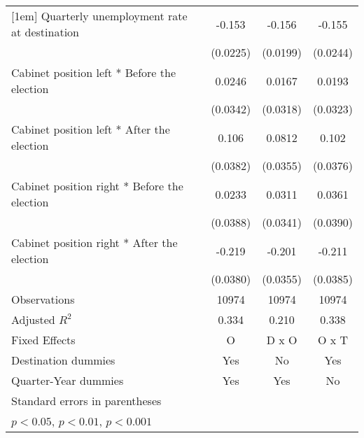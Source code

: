 \begin{table}[htbp]
\begin{tabular}{l*{3}{c}}
[1em]
Quarterly unemployment rate at destination&      -0.153\sym{***}&      -0.156\sym{***}&      -0.155\sym{***}\\
                    &    (0.0225)         &    (0.0199)         &    (0.0244)         \\
[1em]
Cabinet position left * Before the election&      0.0246         &      0.0167         &      0.0193         \\
                    &    (0.0342)         &    (0.0318)         &    (0.0323)         \\
[1em]
Cabinet position left * After the election&       0.106\sym{**} &      0.0812\sym{*}  &       0.102\sym{**} \\
                    &    (0.0382)         &    (0.0355)         &    (0.0376)         \\
[1em]
Cabinet position right * Before the election&      0.0233         &      0.0311         &      0.0361         \\
                    &    (0.0388)         &    (0.0341)         &    (0.0390)         \\
[1em]
Cabinet position right * After the election&      -0.219\sym{***}&      -0.201\sym{***}&      -0.211\sym{***}\\
                    &    (0.0380)         &    (0.0355)         &    (0.0385)         \\
\hline
Observations        &       10974         &       10974         &       10974         \\
Adjusted \(R^{2}\)  &       0.334         &       0.210         &       0.338         \\
Fixed Effects       &           O         &       D x O         &       O x T         \\
Destination dummies &         Yes         &          No         &         Yes         \\
Quarter-Year dummies&         Yes         &         Yes         &          No         \\
\hline\hline
\multicolumn{4}{l}{\footnotesize Standard errors in parentheses}\\
\multicolumn{4}{l}{\footnotesize \sym{*} \(p<0.05\), \sym{**} \(p<0.01\), \sym{***} \(p<0.001\)}\\
\end{tabular}
\end{table}
